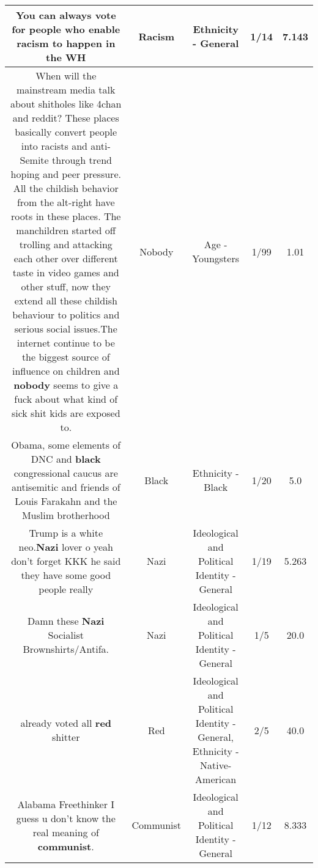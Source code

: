 \documentclass[11pt]{article}
\newlength\mylength
\begin{document}
\begin{center}
\begin{longtable}{|C{.65\mylength}|C{.30\mylength}|C{.12\mylength}|C{.12\mylength}|C{.12\mylength}|}
  \small You can always vote for people who enable \textbf{racism} to happen in the WH\normalsize   & Racism & Ethnicity - General & 1/14 & 7.143 \\  \hline
  \small When will the mainstream media talk about shitholes like 4chan and reddit? These places basically convert people into racists and anti-Semite through trend hoping and peer pressure. All the childish behavior from the alt-right have roots in these places. The manchildren started off trolling and attacking each other over different taste in video games and other stuff, now they extend all these childish behaviour to politics and serious social issues.The internet continue to be the biggest source of influence on children and \textbf{nobody} seems to give a fuck about what kind of sick shit kids are exposed to.\normalsize   & Nobody & Age - Youngsters & 1/99 & 1.01 \\  \hline
  \small Obama, some elements of DNC and \textbf{black} congressional caucus are antisemitic and friends of Louis Farakahn and the Muslim brotherhood\normalsize   & Black & Ethnicity - Black & 1/20 & 5.0 \\  \hline
  \small Trump is a white neo.\textbf{Nazi} lover o yeah don't forget KKK he said they have some good people really\normalsize   & Nazi &  Ideological and Political Identity - General & 1/19 & 5.263 \\  \hline
  \small Damn these \textbf{Nazi} Socialist Brownshirts/Antifa.\normalsize   & Nazi &  Ideological and Political Identity - General & 1/5 & 20.0 \\  \hline
  \small already voted all \textbf{r\textbf{ed}} shitter\normalsize   & Red &  Ideological and Political Identity - General, Ethnicity - Native-American & 2/5 & 40.0 \\  \hline
  \small Alabama Freethinker I guess u don't know the real meaning of \textbf{communist}.\normalsize   & Communist &  Ideological and Political Identity - General & 1/12 & 8.333 \\  \hline

\end{longtable}
\end{center}
\end{document}
